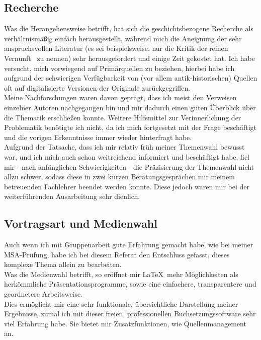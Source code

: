 \documentclass[12pt,a4paper,final]{article}
\begin{document}
\subsection*{Recherche}
Was die Herangehensweise betrifft, hat sich die geschichtsbezogene Recherche als verhältnismäßig einfach herausgestellt, während mich die Aneignung der sehr anspruchsvollen Literatur (es sei beispielsweise. nur die \glqq Kritik der reinen Vernunft\grqq\ \cite{kritik}
 zu nennen) sehr herausgefordert und einige Zeit gekostet hat. Ich habe versucht, mich vorwiegend auf Primärquellen zu beziehen, hierbei habe ich aufgrund der schwierigen Verfügbarkeit von (vor allem antik-historischen) Quellen oft auf digitalisierte Versionen der Originale zurückgegriffen.\\
Meine Nachforschungen waren davon geprägt, dass ich meist den Verweisen einzelner Autoren nachgegangen bin und mir dadurch einen guten Überblick über die Thematik erschließen konnte. Weitere Hilfsmittel zur Verinnerlichung der Problematik benötigte ich nicht, da ich mich fortgesetzt mit der Frage beschäftigt und die vorigen Erkenntnisse immer wieder hinterfragt habe.\\

Aufgrund der Tatsache, dass ich mir relativ früh meiner Themenwahl bewusst war, und ich mich auch schon weitreichend informiert und beschäftigt habe, fiel mir - nach anfänglichen Schwierigkeiten - die Präzisierung der Themenwahl nicht allzu schwer, sodass diese in zwei kurzen Beratungsgesprächen mit meinem betreuenden Fachlehrer beendet werden konnte. Diese jedoch waren mir bei der weiterführenden Ausarbeitung sehr dienlich.

\subsection*{Vortragsart und Medienwahl}
Auch wenn ich mit Gruppenarbeit gute Erfahrung gemacht habe, wie bei meiner MSA-Prüfung, 
habe ich bei diesem Referat den Entschluss gefasst, dieses komplexe Thema allein zu bearbeiten.\\
Was die Medienwahl betrifft, so eröffnet mir \LaTeX\ mehr Möglichkeiten als herkömmliche Präsentationsprogramme, sowie eine einfachere, transparentere und geordnetere Arbeitsweise.\\
Dies ermöglicht mir eine sehr funktionale, übersichtliche Darstellung meiner Ergebnisse, zumal ich mit dieser freien, professionellen Buchsetzungssoftware sehr viel Erfahrung habe. Sie bietet mir Zusatzfunktionen, wie Quellenmanagement an.
\end{document}
